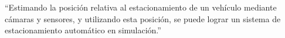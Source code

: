 
``Estimando la posición relativa al estacionamiento de un vehículo mediante cámaras y sensores,
y utilizando esta posición, se puede lograr un sistema de estacionamiento automático en simulación.''
